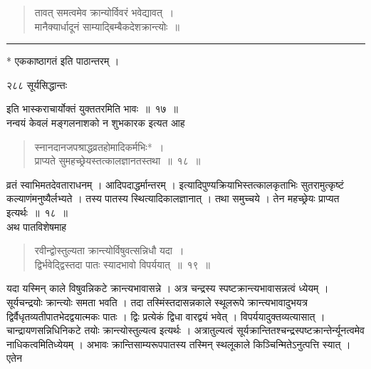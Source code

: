 \documentclass[11pt, openany]{book}
\begin{document}
\begin{quote}
{\qt तावत् समत्वमेव क्रान्योर्विवरं भवेद्यावत्~।\\ 
मानैक्यार्धादूनं साम्याद्बिम्बैकदेशक्रान्त्योः~॥}
\end{quote}
\noindent\rule{\linewidth}{.5pt}

\begin{center}
 * एककाष्ठागतं इति पाठान्तरम् ।
 \end{center}
 


\newpage

\noindent २८८ \hspace{4cm} सूर्यसिद्धान्तः
\vspace{1cm}


\noindent इति भास्कराचार्योक्तं युक्ततरमिति भावः~॥~१७~॥\\
\noindent नन्वयं केवलं मङ्गलनाशको न शुभकारक इत्यत आह \textendash

\begin{quote}
{\ssi स्नानदानजपश्राद्धव्रतहोमादिकर्मभिः*~।\\
 प्राप्यते सुमहच्छ्रेयस्तत्कालज्ञानतस्तथा~॥~१८~॥}
\end{quote}
 व्रतं स्वाभिमतदेवताराधनम् । आदिपदाद्धर्मान्तरम् । इत्यादिपुण्यक्रियाभिस्तत्कालकृताभिः सुतरामुत्कृष्टं कल्याणंमनुष्यैर्लभ्यते । तस्य पातस्य स्थित्यादिकालज्ञानात् । तथा समुच्चये । तेन महच्छ्रेयः प्राप्यत इत्यर्थः~॥~१८~॥\\
 \noindent अथ पातविशेषमाह \textendash

\begin{quote}
 {\ssi रवीन्द्वोस्तुल्यता क्रान्त्योर्विषुवत्सन्निधौ यदा~। \\
 द्विर्भवेद्द्विस्तदा पातः स्यादभावो विपर्ययात्~॥~१९~॥ }
\end{quote}
 यदा यस्मिन् काले विषुवन्निकटे क्रान्त्यभावासन्ने । अत्र चन्द्रस्य स्पष्टक्रान्त्यभावासन्नत्वं ध्येयम् । सूर्यचन्द्रयोः क्रान्त्योः समता भवति । तदा तस्मिंस्तदासन्नकाले स्थूलरूपे क्रान्त्यभावादुभयत्र द्विर्वैधृतव्यतीपातभेदद्वयात्मकः पातः । द्विः प्रत्येकं द्विधा वारद्वयं भवेत् । विपर्ययादुक्तव्यत्यासात् । चान्द्रायणसन्निधिनिकटे तयोः क्रान्त्योस्तुल्यत्व इत्यर्थः । अत्रातुल्यत्वं सूर्यक्रान्तितश्चन्द्रस्पष्टक्रान्तेर्न्यूनत्वमेव नाधिकत्वमितिध्येयम् । अभावः क्रान्तिसाम्यरूपपातस्य तस्मिन् स्थलूकाले किञ्चिन्मितेऽनुत्पत्ति स्यात् । एतेन\textendash
%
\end{document}
